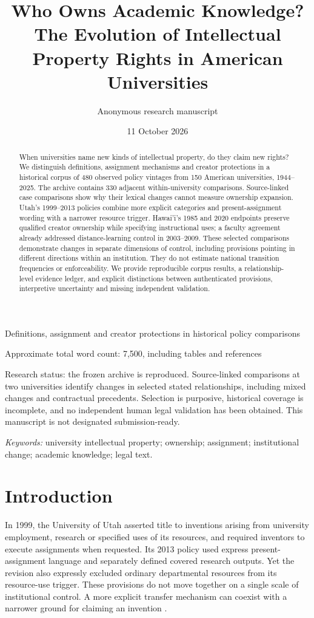 \documentclass[12pt]{article}
\title{Who Owns Academic Knowledge?\\The Evolution of Intellectual Property Rights in American Universities}
\author{Anonymous research manuscript}
\date{11 October 2026}
\begin{document}
\maketitle
\begin{center}
Definitions, assignment and creator protections in historical policy comparisons

Approximate total word count: 7,500, including tables and references
\end{center}
\vfill
\noindent Research status: the frozen archive is reproduced. Source-linked comparisons at two universities identify changes in selected stated relationships, including mixed changes and contractual precedents. Selection is purposive, historical coverage is incomplete, and no independent human legal validation has been obtained. This manuscript is not designated submission-ready.
\newpage
\begin{abstract}
When universities name new kinds of intellectual property, do they claim new rights? We distinguish definitions, assignment mechanisms and creator protections in a historical corpus of 480 observed policy vintages from 150 American universities, 1944--2025. The archive contains 330 adjacent within-university comparisons. Source-linked case comparisons show why their lexical changes cannot measure ownership expansion. Utah's 1999--2013 policies combine more explicit categories and present-assignment wording with a narrower resource trigger. Hawai'i's 1985 and 2020 endpoints preserve qualified creator ownership while specifying instructional uses; a faculty agreement already addressed distance-learning control in 2003--2009. These selected comparisons demonstrate changes in separate dimensions of control, including provisions pointing in different directions within an institution. They do not estimate national transition frequencies or enforceability. We provide reproducible corpus results, a relationship-level evidence ledger, and explicit distinctions between authenticated provisions, interpretive uncertainty and missing independent validation.
\end{abstract}
\noindent\textit{Keywords:} university intellectual property; ownership; assignment; institutional change; academic knowledge; legal text.

\section{Introduction}
In 1999, the University of Utah asserted title to inventions arising from university employment, research or specified uses of its resources, and required inventors to execute assignments when requested. Its 2013 policy used express present-assignment language and separately defined covered research outputs. Yet the revision also expressly excluded ordinary departmental resources from its resource-use trigger. These provisions do not move together on a single scale of institutional control. A more explicit transfer mechanism can coexist with a narrower ground for claiming an invention \citep[III.B.1]{utah1999} \citep[II.B--C and III.B.1]{utah2013}.
\end{document}

